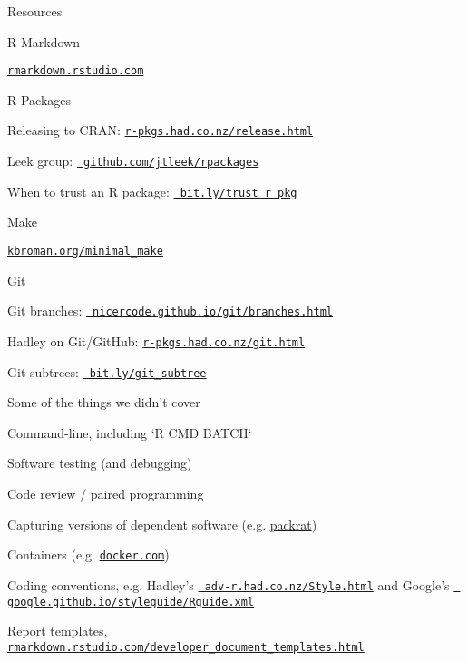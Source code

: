 \documentclass[12pt,t]{beamer}
\begin{document}
\begin{frame}[c]{Resources}

  \bi
\item R Markdown
  \bi
    \item \href{https://rmarkdown.rstudio.com}{\tt rmarkdown.rstudio.com}
  \ei
\item R Packages
  \bi
    \item Releasing to CRAN:
      \href{http://r-pkgs.had.co.nz/release.html}{\tt \footnotesize r-pkgs.had.co.nz/release.html}
    \item Leek group: \href{https://github.com/jtleek/rpackages}{\tt
      \footnotesize github.com/jtleek/rpackages}
    \item When to trust an R package:
      \href{https://simplystatistics.org/2015/11/06/how-i-decide-when-to-trust-an-r-package/}{\tt
        \footnotesize bit.ly/trust\_r\_pkg}
  \ei
\item Make
  \bi
    \item \href{http://kbroman.org/minimal_make}{\tt kbroman.org/minimal\_make}
  \ei
\item Git
  \bi
    \item Git branches:
      \href{https://nicercode.github.io/git/branches.html}{\tt
        \footnotesize nicercode.github.io/git/branches.html}
    \item Hadley on Git/GitHub:
      \href{http://r-pkgs.had.co.nz/git.html}{\tt \footnotesize r-pkgs.had.co.nz/git.html}
    \item Git subtrees:
      \href{https://developer.atlassian.com/blog/2015/05/the-power-of-git-subtree/}{\tt
        \footnotesize bit.ly/git\_subtree}
  \ei
  \ei

\end{frame}


\begin{frame}[c]{Some of the things we didn't cover}

  \bi
\item Command-line, including `R CMD BATCH`
\item Software testing (and debugging)
\item Code review / paired programming
\item Capturing versions of dependent software (e.g.
  \href{https://rstudio.github.io/packrat}{packrat})
\item Containers (e.g. \href{https://www.docker.com}{\tt \footnotesize docker.com})
\item Coding conventions, e.g.
  Hadley's \href{http://adv-r.had.co.nz/Style.html}{\tt \footnotesize
    adv-r.had.co.nz/Style.html} and
  Google's
  \href{https://google.github.io/styleguide/Rguide.xml}{\tt
      \footnotesize google.github.io/styleguide/Rguide.xml}
\item Report templates,
  \href{http://rmarkdown.rstudio.com/developer_document_templates.html}{\tt
    \footnotesize rmarkdown.rstudio.com/developer\_document\_templates.html}

  \ei


\end{frame}
\end{document}
